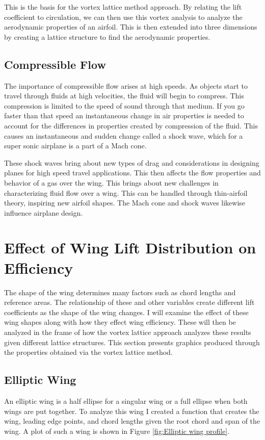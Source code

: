 \documentclass{article}
\begin{document}
This is the basis for the vortex lattice method approach. By relating  the lift coefficient to circulation, we can then use this vortex analysis to analyze the aerodynamic properties of an airfoil. This is then extended into three dimensions by creating a lattice structure to find the aerodynamic properties.

\subsection{Compressible Flow}
The importance of compressible flow arises at high speeds. As objects start to travel through fluids at high velocities, the fluid will begin to compress. This compression is limited to the speed of sound through that medium. If you go faster than that speed an instantaneous change in air properties is needed to account for the differences in properties created by compression of the fluid. This causes an instantaneous and sudden change called a shock wave, which for a super sonic airplane is a part of a Mach cone. 

These shock waves bring about new types of drag and considerations in designing planes for high speed travel applications. This then affects the flow properties and behavior of a gas over the wing. This brings about new challenges in characterizing fluid flow over a wing. This can be handled through thin-airfoil theory, inspiring new airfoil shapes. The Mach cone and shock waves likewise influence airplane design.

\section{Effect of Wing Lift Distribution on Efficiency}
The shape of the wing determines many factors such as chord lengths and reference areas. The relationship of these and other variables create different lift coefficients as the shape of the wing changes. I will examine the effect of these wing shapes along with how they effect wing efficiency. These will then be analyzed in the frame of how the vortex lattice approach analyzes these results given different lattice structures. This section presents graphics produced through the properties obtained via the vortex lattice method.

\subsection{Elliptic Wing}
An elliptic wing is a half ellipse for a singular wing or a full ellipse when both wings are put together. To analyze this wing I created a function that creates the wing, leading edge points, and chord lengths given the root chord and span of the wing. A plot of such a wing is shown in Figure \ref{fig:Elliptic wing profile}. 
\end{document}
